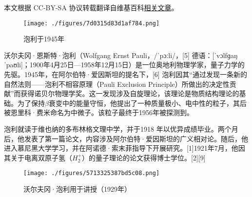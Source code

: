 
本文根据 CC-BY-SA 协议转载翻译自维基百科\href{https://en.wikipedia.org/wiki/Wolfgang_Pauli}{相关文章}。

\begin{figure}[ht]
\centering
\texttt{[image: ./figures/7d0315d83d1af784.png]}
\caption{泡利于1945年} \label{fig_Pauli2_1}
\end{figure}
沃尔夫冈·恩斯特·泡利（Wolfgang Ernst Pauli，/ˈpɔːli/，[5] 德语：[ˈvɔlfɡaŋ ˈpaʊli]；1900年4月25日—1958年12月15日）是一位奥地利物理学家，量子力学的先驱。1945年，在阿尔伯特·爱因斯坦的提名下，[6] 泡利因其“通过发现一条新的自然法则——泡利不相容原理（Pauli Exclusion Principle）所做出的决定性贡献”而获得诺贝尔物理学奖。这一发现涉及自旋理论，该理论是物质结构理论的基础。为了保持\(\beta\)衰变中的能量守恒，他提出了一种质量极小、电中性的粒子，其后被恩里科·费米命名为中微子。该粒子最终于1956年被探测到。

泡利就读于维也纳的多布林格文理中学，并于1918 年以优异成绩毕业。两个月后，他发表了第一篇论文，内容涉及阿尔伯特·爱因斯坦的广义相对论。随后，他进入慕尼黑大学学习，并在阿诺德·索末菲指导下开展研究。[1]1921年7月，他因其关于电离双原子氢（\(H_2^+\)）的量子理论的论文获得博士学位。[2][9]
\begin{figure}[ht]
\centering
\texttt{[image: ./figures/5713325387bd5c08.png]}
\caption{沃尔夫冈·泡利用于讲授（1929年）} \label{fig_Pauli2_2}
\end{figure}
